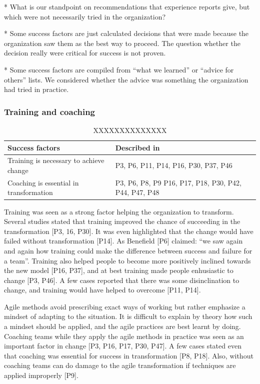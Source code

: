 \documentclass[preprint,authoryear,12pt]{elsarticle}
\begin{document}
* What is our standpoint on recommendations that experience reports give, but
  which were not necessarily tried in the organization?

* Some success factors are just calculated decisions that were made because
  the organization saw them as the best way to proceed. The question whether
  the decision really were critical for success is not proven. 

* Some success factors are compiled from ``what we learned'' or ``advice for
  others'' lists. We considered whether the advice was something the
  organization had tried in practice.

\subsubsection{Training and coaching}

\begin{table}[h]
    \centering
    \begin{tabular}{ >{\raggedright\arraybackslash}p{}
                     >{\raggedright\arraybackslash}p{} }
        \toprule
        Success factors  &  Described in \\
        \midrule
        Training is necessary to achieve change  &
                P3, P6, P11, P14, P16, P30, P37, P46 \\
        Coaching is essential in transformation  &
                P3, P6, P8, P9 P16, P17, P18, P30, P42, P44, P47, P48  \\
        \bottomrule
    \end{tabular}
    \caption{XXXXXXXXXXXXXX}
    \label{table:success_NN}
\end{table}

Training was seen as a strong factor helping the organization to transform.
Several studies stated that training improved the chance of succeeding in the
transformation [P3, 16, P30]. It was even highlighted that the change would have
failed without transformation [P14]. As Benefield [P6] claimed: ``we saw again
and again how training could make the difference between success and failure for
a team''. Training also helped people to become more positively inclined towards
the new model [P16, P37], and at best training made people enhusiastic to change
[P3, P46]. A few cases reported that there was some disinclination to change,
and training would have helped to overcome [P11, P14].

Agile methods avoid prescribing exact ways of working but rather emphasize a
mindset of adapting to the situation. It is difficult to explain by theory how
such a mindset should be applied, and the agile practices are best learnt by
doing. Coaching teams while they apply the agile methods in practice was seen as
an important factor in change [P3, P16, P17, P30, P47]. A few cases stated even
that coaching was essential for success in transformation [P8, P18]. Also,
without coaching teams can do damage to the agile transformation if techniques
are applied improperly [P9].
\end{document}
